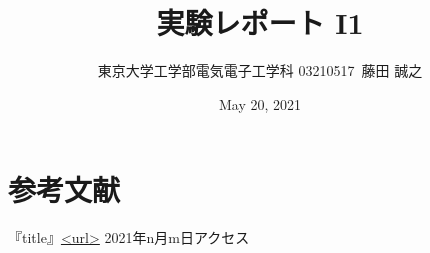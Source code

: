 \documentclass{ltjsarticle}
\title{実験レポート I1}
\author{東京大学工学部電気電子工学科 03210517\ 藤田 誠之 }
\date{ May 20, 2021}
\begin{document}
\maketitle
\section{参考文献}
『title』\url{<url>} 2021年n月m日アクセス
\end{document}
